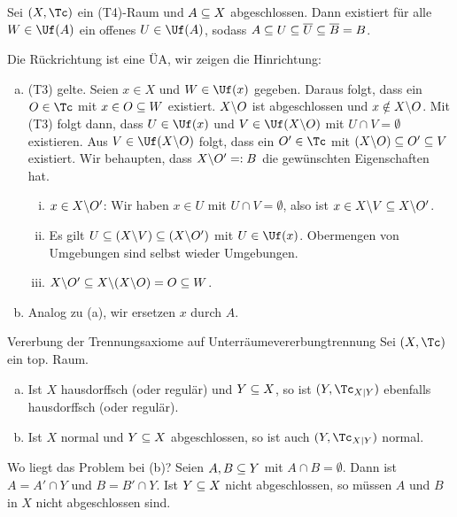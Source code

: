 \begin{bemerkung}
Sei $(X, \Tc)$ ein (T4)-Raum und $A \subseteq X$ abgeschlossen. Dann existiert für alle $W \in \Uf(A)$ ein offenes $U \in \Uf(A)$, sodass $A \subseteq U \subseteq \overline{U} \subseteq \overline{B}=B$.
\end{bemerkung}
\begin{beweis}
Die Rückrichtung ist eine ÜA, wir zeigen die Hinrichtung:
\begin{enumerate}[(a)]
\item (T3) gelte. Seien $x \in X$ und $W \in \Uf(x)$ gegeben. Daraus folgt, dass ein $O \in \Tc$ mit $x \in O \subseteq W$ existiert. $X \backslash O$ ist abgeschlossen und $x \notin X \backslash O$. Mit (T3) folgt dann, dass $U \in \Uf(x)$ und $V \in \Uf(X \exc O)$ mit $U \cap V = \emptyset$ existieren. Aus $V \in \Uf(X \exc O)$ folgt, dass ein $O' \in \Tc$ mit $(X \backslash O) \subseteq O' \subseteq V$ existiert. Wir behaupten, dass $X \backslash O' =: B$ die gewünschten Eigenschaften hat.
\begin{enumerate}[(i)]
\item $x \in X \backslash O'$: Wir haben $x \in U$ mit $U \cap V = \emptyset$, also ist $x \in X \backslash V \subseteq X \backslash O'$.
\item Es gilt $U \subseteq (X \backslash V) \subseteq (X \backslash O')$ mit $U \in \Uf(x)$. Obermengen von Umgebungen sind selbst wieder Umgebungen.
\item $X \backslash O' \subseteq X \backslash (X \backslash O) = O \subseteq W$.
\end{enumerate}
\item Analog zu (a), wir ersetzen $x$ durch $A$.
\end{enumerate}
\end{beweis}
\begin{satz}{Vererbung der Trennungsaxiome auf Unterräume}{vererbungtrennung}
Sei $(X, \Tc)$ ein top. Raum.
\begin{enumerate}[(a)]
\item Ist $X$ hausdorffsch (oder regulär) und $Y \subseteq X$, so ist $(Y, \Tc_{X|Y})$ ebenfalls hausdorffsch (oder regulär).
\item Ist $X$ normal und $Y \subseteq X$ abgeschlossen, so ist auch $(Y, \Tc_{X|Y})$ normal.
\end{enumerate}
\end{satz}
\begin{bemerkung}
Wo liegt das Problem bei (b)? Seien $A,B \subseteq Y$ mit $A \cap B = \emptyset$. Dann ist $A= A' \cap Y$ und $B = B' \cap Y$. Ist $Y \subseteq X$ nicht abgeschlossen, so müssen $A$ und $B$ in $X$ nicht abgeschlossen sind.
\end{bemerkung}
